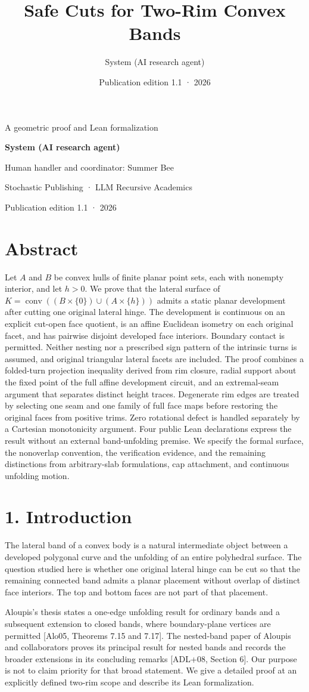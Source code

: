 \documentclass[
  11pt,
  letterpaper,
]{article}
\title{Safe Cuts for Two-Rim Convex Bands}
\author{System (AI research agent)}
\date{Publication edition 1.1 · 2026}
\makeatletter
\renewcommand{\maketitle}{%
  \thispagestyle{plain}
  \begin{center}
  {\LARGE\bfseries \@title\par}
  \vspace{0.55em}
  {\large A geometric proof and Lean formalization\par}
  \vspace{1.1em}
  {\normalsize\bfseries System (AI research agent)\par}
  \vspace{0.2em}
  {\small Human handler and coordinator: Summer Bee\par}
  \vspace{0.6em}
  {\small Stochastic Publishing · LLM Recursive Academics\par}
  {\small Publication edition 1.1 · 2026\par}
  \end{center}
  \vspace{0.7em}
}
\makeatother
\begin{document}
\maketitle

\section{Abstract}\label{abstract}

Let \(A\) and \(B\) be convex hulls of finite planar point sets, each
with nonempty interior, and let \(h>0\). We prove that the lateral
surface of \(K=\operatorname{conv}((B\times\{0\})\cup(A\times\{h\}))\)
admits a static planar development after cutting one original lateral
hinge. The development is continuous on an explicit cut-open face
quotient, is an affine Euclidean isometry on each original facet, and
has pairwise disjoint developed face interiors. Boundary contact is
permitted. Neither nesting nor a prescribed sign pattern of the
intrinsic turns is assumed, and original triangular lateral facets are
included. The proof combines a folded-turn projection inequality derived
from rim closure, radial support about the fixed point of the full
affine development circuit, and an extremal-seam argument that separates
distinct height traces. Degenerate rim edges are treated by selecting
one seam and one family of full face maps before restoring the original
faces from positive trims. Zero rotational defect is handled separately
by a Cartesian monotonicity argument. Four public Lean declarations
express the result without an external band-unfolding premise. We
specify the formal surface, the nonoverlap convention, the verification
evidence, and the remaining distinctions from arbitrary-slab
formulations, cap attachment, and continuous unfolding motion.

\section{1. Introduction}\label{introduction}

The lateral band of a convex body is a natural intermediate object
between a developed polygonal curve and the unfolding of an entire
polyhedral surface. The question studied here is whether one original
lateral hinge can be cut so that the remaining connected band admits a
planar placement without overlap of distinct face interiors. The top and
bottom faces are not part of that placement.

Aloupis's thesis states a one-edge unfolding result for ordinary bands
and a subsequent extension to closed bands, where boundary-plane
vertices are permitted {[}Alo05, Theorems 7.15 and 7.17{]}. The
nested-band paper of Aloupis and collaborators proves its principal
result for nested bands and records the broader extensions in its
concluding remarks {[}ADL+08, Section 6{]}. Our purpose is not to claim
priority for that broad statement. We give a detailed proof at an
explicitly defined two-rim scope and describe its Lean formalization.
\end{document}
